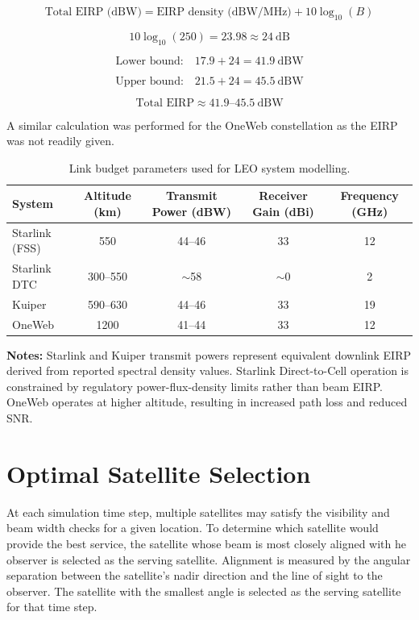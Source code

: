 \[
\text{Total EIRP (dBW)} = \text{EIRP density (dBW/MHz)} 
+ 10\log_{10}(B)
\]

\[
10\log_{10}(250) = 23.98 \approx 24 \ \mathrm{dB}
\]

\[
\text{Lower bound:}\quad
17.9 + 24 = 41.9 \ \mathrm{dBW}
\]

\[
\text{Upper bound:}\quad
21.5 + 24 = 45.5 \ \mathrm{dBW}
\]

\[
\boxed{
\text{Total EIRP} \approx 41.9\text{--}45.5 \ \mathrm{dBW}
}
\]


A similar calculation was performed for the OneWeb constellation as the EIRP was not readily given. 


\begin{table}[h!]
\centering
\small
\caption{Link budget parameters used for LEO system modelling.}
\label{tab:leo_link_budget_paramaters}
\begin{tabular}{|l|c|c|c|c|}
\hline
\textbf{System} &
\textbf{Altitude (km)} &
\textbf{Transmit Power (dBW)} &
\textbf{Receiver Gain (dBi)} &
\textbf{Frequency (GHz)} \\
\hline

Starlink (FSS) \cite{FCC22_91A1} &
550 &
44--46 &
33 &
12 \\
\hline

Starlink DTC \cite{Wang2025FCCStarlinkDTC} &
300--550 &
$\sim$58 &
$\sim$0 &
2 \\
\hline

Kuiper \cite{SpaceX2021SATLOA00145}&
590--630 &
44--46 &
33 &
19 \\
\hline

OneWeb\cite{OneWeb2020SATMPL00062} &
1200 &
41--44 &
33 &
12  \\
\hline
\end{tabular}
\end{table}

\noindent\textbf{Notes:}
Starlink and Kuiper transmit powers represent equivalent downlink EIRP derived from
reported spectral density values. Starlink Direct-to-Cell operation is constrained by
regulatory power-flux-density limits rather than beam EIRP. OneWeb operates at higher
altitude, resulting in increased path loss and reduced SNR.


\section{Optimal Satellite Selection}
At each simulation time step, multiple satellites may satisfy the visibility and beam width checks for a given location. To determine which satellite would provide the best service, the satellite whose beam is most closely aligned with he observer is selected as the serving satellite. Alignment is measured by the angular separation between the satellite's nadir direction and the line of sight to the observer. The satellite with the smallest angle is selected as the serving satellite for that time step.

